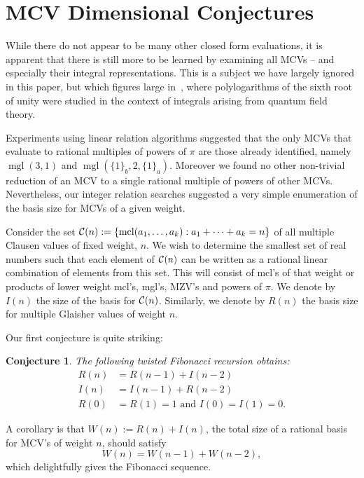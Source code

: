 \documentclass[a4paper,a4paper]{article}
\newtheorem{Conj}{Conjecture}
\newcommand{\mcl}{\operatorname{mcl}}
\newcommand{\mgl}{\operatorname{mgl}}
\begin{document}
\section{MCV Dimensional Conjectures}

While there do not appear to be many other closed form
evaluations, it is apparent that there is still more to be learned by
 examining all MCVs -- and especially their integral
 representations. This is a subject
 we have largely ignored in this paper, but which figures large
  in~\cite{sixth}, where polylogarithms of the sixth root of unity
  were studied in the context of integrals arising
  from quantum field theory.

 Experiments using linear relation algorithms suggested that
the only MCVs that evaluate
to      rational multiples of powers of $ \pi $
are those already identified,
namely $ \mgl(3,1) $    and
$ \mgl(\{ 1 \}_b , 2, \{ 1 \}_a) $.
Moreover we found no other non-trivial
reduction of an MCV to a single rational
multiple of powers of other MCVs.
Nevertheless,   our integer relation
searches suggested a very simple enumeration of
the basis size for MCVs of a given weight.

Consider the set
$ {\cal C}(n) :=\{ \mcl(a_1, \dots, a_k) : a_1 + \dots + a_k = n \}$
of      all multiple Clausen values
of fixed weight, $n$.
We wish to determine    the smallest set of real numbers such that each
   element of ${\cal C}(n) $
   can be written as a rational linear combination of elements
    from this set.
    This will consist of mcl's of that weight
     or products of lower weight mcl's, mgl's, MZV's and powers of $ \pi $.
     We denote by $I(n)$ the size of the basis for ${\cal C}(n)$.
     Similarly, we denote by $R(n)$ the basis size for multiple Glaisher
     values
     of weight $n$.

Our first conjecture is quite striking:

\begin{Conj}
The following {\em twisted Fibonacci} recursion obtains:
\begin{align*}
R(n) &= R(n-1) + I(n-2) \\
I(n) &= I(n-1) + R(n-2) \\
R(0) &= R(1) = 1 \mbox{ and }
I(0) = I(1) = 0.
\end{align*}
\end{Conj}

A corollary is that $ W(n) := R(n) +    I(n) $,
the total size of a rational basis for
MCV's of weight $n$, should satisfy
$$ W(n) =        W(n-1) + W(n-2),$$
which delightfully gives the Fibonacci sequence.
\end{document}

